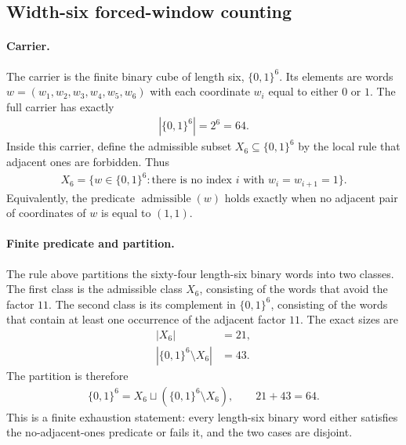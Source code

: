 
\subsection{Width-six forced-window counting}
\label{sec:window6-three-rigidity-window-observation}

\paragraph{Carrier.}
The carrier is the finite binary cube of length six,
$\{0,1\}^6$.  Its elements are words $w=(w_1,w_2,w_3,w_4,w_5,w_6)$ with each coordinate $w_i$ equal to either $0$ or $1$.  The full carrier has exactly
$$
\begin{aligned}
|\{0,1\}^6|=2^6=64 .
\end{aligned}
$$
Inside this carrier, define the admissible subset
$X_6 \subseteq \{0,1\}^6$ by the local rule that adjacent ones are forbidden.  Thus
$$
\begin{aligned}
X_6=\{w\in\{0,1\}^6 : \text{there is no index } i \text{ with } w_i=w_{i+1}=1\} .
\end{aligned}
$$
Equivalently, the predicate $\operatorname{admissible}(w)$ holds exactly when no adjacent pair of coordinates of $w$ is equal to $(1,1)$.

\paragraph{Finite predicate and partition.}
The rule above partitions the sixty-four length-six binary words into two classes.  The first class is the admissible class $X_6$, consisting of the words that avoid the factor $11$.  The second class is its complement in $\{0,1\}^6$, consisting of the words that contain at least one occurrence of the adjacent factor $11$.  The exact sizes are
$$
\begin{aligned}
|X_6|&=21,\\
|\{0,1\}^6\setminus X_6|&=43.
\end{aligned}
$$
The partition is therefore
$$
\begin{aligned}
\{0,1\}^6=X_6\sqcup (\{0,1\}^6\setminus X_6),\qquad 21+43=64 .
\end{aligned}
$$
This is a finite exhaustion statement: every length-six binary word either satisfies the no-adjacent-ones predicate or fails it, and the two cases are disjoint.


